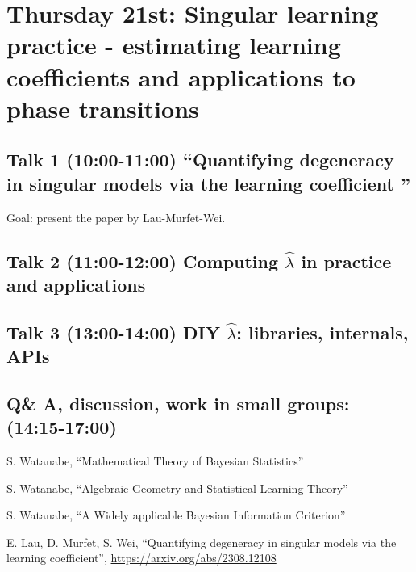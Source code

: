 \documentclass[a4paper,11pt]{amsart}
\newcommand{\lambdahat}{\widehat{\lambda}}
\begin{document}
\section*{Thursday 21st: Singular learning practice - estimating learning coefficients and applications to phase transitions}

\subsection*{Talk 1 (10:00-11:00) ``Quantifying degeneracy in singular models via the learning coefficient ''}

Goal: present the paper \cite{lambdahat} by Lau-Murfet-Wei.

\subsection*{Talk 2 (11:00-12:00) Computing $\lambdahat$ in practice and applications}

\subsection*{Talk 3 (13:00-14:00) DIY $\lambdahat$: libraries, internals, APIs}

\subsection*{Q\& A, discussion, work in small groups: (14:15-17:00)}


\begin{thebibliography}{99}

 S. Watanabe, ``Mathematical Theory of Bayesian Statistics''

 S. Watanabe, ``Algebraic Geometry and Statistical Learning Theory''

 S. Watanabe, ``A Widely applicable Bayesian Information Criterion''
  
 E. Lau, D. Murfet, S. Wei, ``Quantifying degeneracy in singular models via the learning coefficient'', \url{https://arxiv.org/abs/2308.12108}

\end{thebibliography}
  
\end{document}
